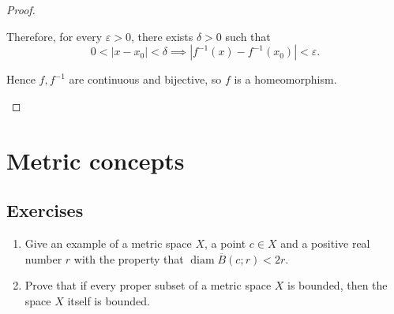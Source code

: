 \begin{proof}
\begin{enumerate}[label={(\alph*)}]
		      Therefore, for every \( \varepsilon > 0 \), there exists \( \delta > 0 \) such that
		      \[
			      0 < \left\vert x - x_{0} \right\vert < \delta \implies \left\vert f^{-1}(x) - f^{-1}(x_{0}) \right\vert < \varepsilon.
		      \]

		      Hence \( f, f^{-1} \) are continuous and bijective, so \( f \) is a homeomorphism. \qedhere
	\end{enumerate}
\end{proof}

\section{Metric concepts}

\subsection*{Exercises}

\begin{enumerate}[label={(\alph*)}]
	\item Give an example of a metric space \( X \), a point \( c \in X \) and a positive real number \( r \) with the property that \( \operatorname{diam} \overline{B}(c; r) < 2r \).
	\item Prove that if every proper subset of a metric space \( X \) is bounded, then the space \( X \) itself is bounded.
\end{enumerate}

